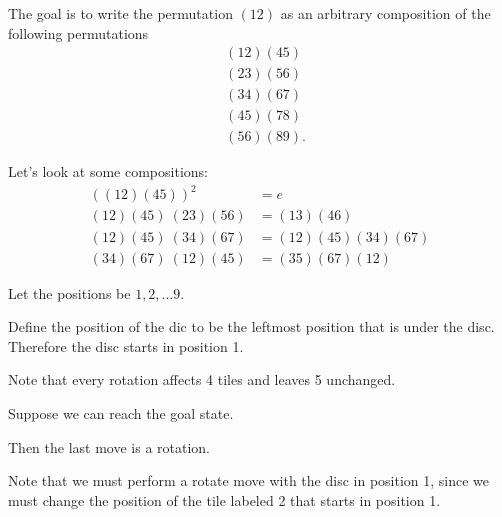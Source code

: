 \documentclass[12pt]{article}
\begin{document}
The goal is to write the permutation $(12)$ as an arbitrary composition of the following
permutations
\begin{align*}
  &(12)(45)\\
  &(23)(56)\\
  &(34)(67)\\
  &(45)(78)\\
  &(56)(89).
\end{align*}

Let's look at some compositions:
\begin{align*}
  ((12)(45))^2        &= e\\
  (12)(45) ~ (23)(56) &= (13)(46)\\
  (12)(45) ~ (34)(67) &= (12)(45)(34)(67)\\
  (34)(67) ~ (12)(45) &= (35)(67)(12)
\end{align*}


Let the positions be $1, 2, \ldots 9$.

Define the position of the dic to be the leftmost position that is under the disc. Therefore the
disc starts in position 1.

Note that every rotation affects 4 tiles and leaves 5 unchanged.

Suppose we can reach the goal state.

Then the last move is a rotation.

Note that we must perform a rotate move with the disc in position 1, since we must change the
position of the tile labeled 2 that starts in position 1.
\end{document}
